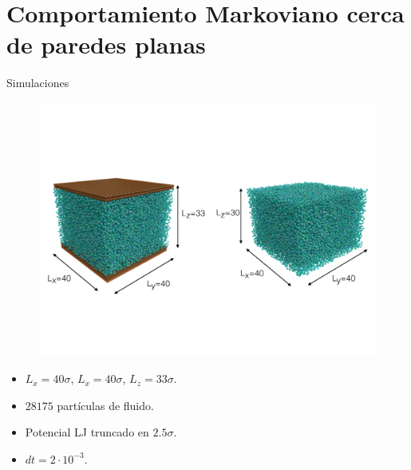 \documentclass{beamer}
\begin{document}
\section{Comportamiento Markoviano cerca de paredes planas}

\begin{frame}{Simulaciones}
\begin{figure}
    \centering
    \includegraphics[width=0.8\linewidth]{dim-sim-pbc-walls}
\end{figure}
    \begin{itemize}
      \item $L_x=40\sigma$, $L_x=40\sigma$, $L_z=33\sigma$.
     \item $28175$ partículas de fluido. 
     \item Potencial LJ truncado en $2.5\sigma$.
     \item $dt=2\cdot 10^{-3}$.
    \end{itemize}
\end{frame}
\end{document}
